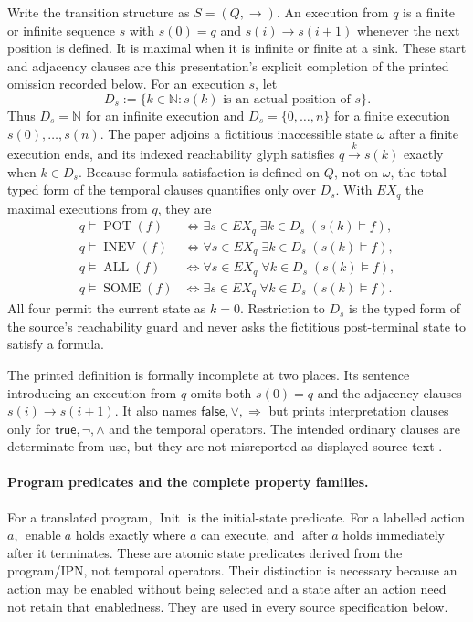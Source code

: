 Write the transition structure as \(S=(Q,\to)\).  An execution from \(q\) is
a finite or infinite sequence \(s\) with \(s(0)=q\) and
\(s(i)\to s(i+1)\) whenever the next position is defined.  It is maximal when
it is infinite or finite at a sink.  These start and adjacency clauses are
this presentation's explicit completion of the printed omission recorded
below.  For an execution \(s\), let
\[
 D_s:=\{k\in\mathbb N:s(k)\text{ is an actual position of }s\}.
\]
Thus \(D_s=\mathbb N\) for an infinite execution and
\(D_s=\{0,\ldots,n\}\) for a finite execution
\(s(0),\ldots,s(n)\).  The paper adjoins a fictitious inaccessible state
\(\omega\) after a finite execution ends, and its indexed reachability glyph
satisfies \(q\xrightarrow{k}s(k)\) exactly when \(k\in D_s\).  Because formula
satisfaction is defined on \(Q\), not on \(\omega\), the total typed form of
the temporal clauses quantifies only over \(D_s\).  With \(EX_q\) the maximal
executions from \(q\), they are
\[
\begin{aligned}
 q\models\operatorname{POT}(f)
 &\Longleftrightarrow
 \exists s\in EX_q\;\exists k\in D_s\;(s(k)\models f),\\
 q\models\operatorname{INEV}(f)
 &\Longleftrightarrow
 \forall s\in EX_q\;\exists k\in D_s\;(s(k)\models f),\\
 q\models\operatorname{ALL}(f)
 &\Longleftrightarrow
 \forall s\in EX_q\;\forall k\in D_s\;(s(k)\models f),\\
 q\models\operatorname{SOME}(f)
 &\Longleftrightarrow
 \exists s\in EX_q\;\forall k\in D_s\;(s(k)\models f).
\end{aligned}
\]
All four permit the current state as \(k=0\).  Restriction to \(D_s\) is the
typed form of the source's reachability guard and never asks the fictitious
post-terminal state to satisfy a formula.

The printed definition is formally incomplete at two places.  Its sentence
introducing an execution from \(q\) omits both \(s(0)=q\) and the adjacency
clauses \(s(i)\to s(i+1)\).  It also names
\(\mathsf{false},\lor,\Rightarrow\) but prints interpretation clauses only
for \(\mathsf{true},\neg,\land\) and the temporal operators.  The intended
ordinary clauses are determinate from use, but they are not misreported as
displayed source text \cite[pp.~344--345]{QueilleSifakis1982}.

\paragraph{Program predicates and the complete property families.}
For a translated program, \(\operatorname{Init}\) is the initial-state
predicate.  For a labelled action \(a\),
\(\operatorname{enable}a\) holds exactly where \(a\) can execute, and
\(\operatorname{after}a\) holds immediately after it terminates.  These are
atomic state predicates derived from the program/IPN, not temporal operators.
Their distinction is necessary because an action may be enabled without
being selected and a state after an action need not retain that enabledness.
They are used in every source specification below.

